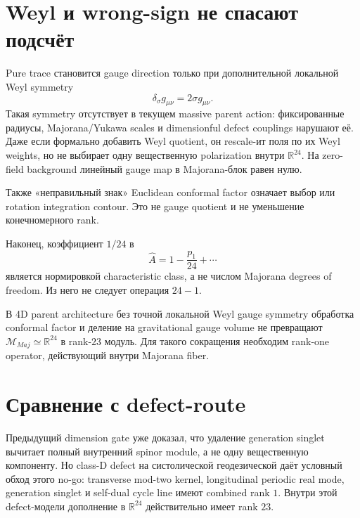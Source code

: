 \section{Weyl и wrong-sign не спасают подсчёт}

Pure trace становится gauge direction только при дополнительной локальной
Weyl symmetry
\begin{equation}
 \delta_\sigma g_{\mu\nu}=2\sigma g_{\mu\nu}.
\end{equation}
Такая symmetry отсутствует в текущем massive parent action: фиксированные
радиусы, Majorana/Yukawa scales и dimensionful defect couplings нарушают её.
Даже если формально добавить Weyl quotient, он rescale-ит поля по их Weyl
weights, но не выбирает одну вещественную polarization внутри
\(\mathbb R^{24}\). На zero-field background линейный gauge map в
Majorana-блок равен нулю.

Также «неправильный знак» Euclidean conformal factor означает выбор или
rotation integration contour. Это не gauge quotient и не уменьшение
конечномерного rank.

Наконец, коэффициент \(1/24\) в
\begin{equation}
 \widehat A=1-\frac{p_1}{24}+\cdots
\end{equation}
является нормировкой characteristic class, а не числом Majorana degrees of
freedom. Из него не следует операция \(24-1\).

\begin{theorem}
В 4D parent architecture без точной локальной Weyl gauge symmetry
обработка conformal factor и деление на gravitational gauge volume не
превращают \(\mathcal M_{Maj}\simeq\mathbb R^{24}\) в rank-\(23\) модуль.
Для такого сокращения необходим rank-one operator, действующий внутри
Majorana fiber.
\end{theorem}

\section{Сравнение с defect-route}

Предыдущий dimension gate уже доказал, что удаление generation singlet
вычитает полный внутренний spinor module, а не одну вещественную компоненту.
Но class-D defect на систолической геодезической даёт условный обход этого
no-go: transverse mod-two kernel, longitudinal periodic real mode,
generation singlet и self-dual cycle line имеют combined rank \(1\). Внутри
этой defect-модели дополнение в \(\mathbb R^{24}\) действительно имеет rank
\(23\).

